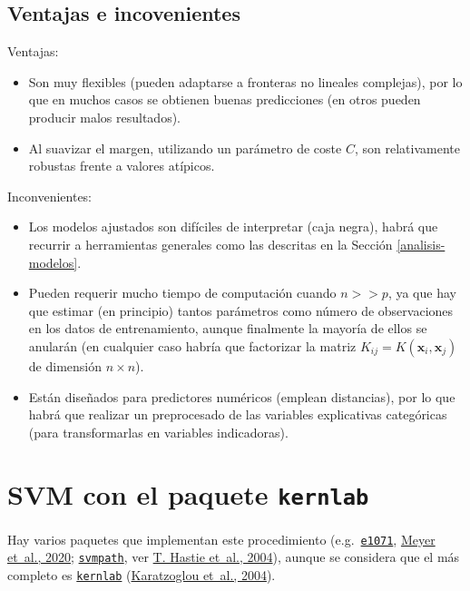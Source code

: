 \documentclass[
]{book}
\theoremstyle{break}
\theoremstyle{nonumberplain}
\begin{document}
\hypertarget{ventajas-e-incovenientes}{%
\subsection{Ventajas e incovenientes}\label{ventajas-e-incovenientes}}

Ventajas:

\begin{itemize}
\item
  Son muy flexibles (pueden adaptarse a fronteras no lineales complejas), por lo que en muchos casos se obtienen buenas predicciones (en otros pueden producir malos resultados).
\item
  Al suavizar el margen, utilizando un parámetro de coste \(C\), son relativamente robustas frente a valores atípicos.
\end{itemize}

Inconvenientes:

\begin{itemize}
\item
  Los modelos ajustados son difíciles de interpretar (caja negra), habrá que recurrir a herramientas generales como las descritas en la Sección \ref{analisis-modelos}.
\item
  Pueden requerir mucho tiempo de computación cuando \(n >> p\), ya que hay que estimar (en principio) tantos parámetros como número de observaciones en los datos de entrenamiento, aunque finalmente la mayoría de ellos se anularán (en cualquier caso habría que factorizar la matriz \(K_{ij} = K(\mathbf{x}_i, \mathbf{x}_j)\) de dimensión \(n \times n\)).
\item
  Están diseñados para predictores numéricos (emplean distancias), por lo que habrá que realizar un preprocesado de las variables explicativas categóricas (para transformarlas en variables indicadoras).
\end{itemize}

\hypertarget{svm-kernlab}{%
\section{\texorpdfstring{SVM con el paquete \texttt{kernlab}}{SVM con el paquete kernlab}}\label{svm-kernlab}}

Hay varios paquetes que implementan este procedimiento (e.g.~\href{https://CRAN.R-project.org/package=e1071}{\texttt{e1071}}, \protect\hyperlink{ref-R-e1071}{Meyer et~al., 2020}; \href{https://CRAN.R-project.org/package=svmpath}{\texttt{svmpath}}, ver \protect\hyperlink{ref-hastie2004entire}{T. Hastie et~al., 2004}), aunque se considera que el más completo es \href{https://CRAN.R-project.org/package=kernlab}{\texttt{kernlab}} (\protect\hyperlink{ref-kernlab2004}{Karatzoglou et~al., 2004}).
\end{document}
